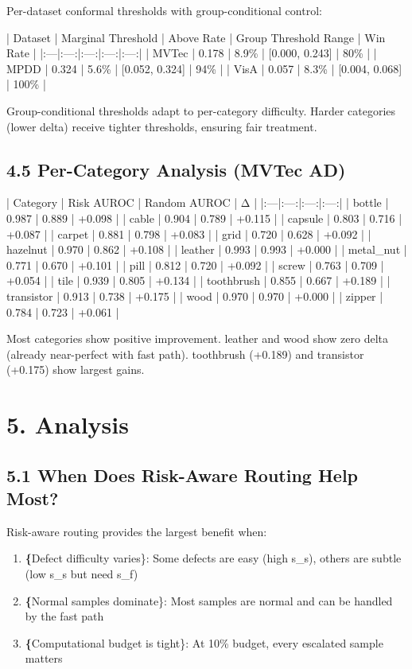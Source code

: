 \documentclass[10pt]{article}
\begin{document}
Per-dataset conformal thresholds with group-conditional control:

| Dataset | Marginal Threshold | Above Rate | Group Threshold Range | Win Rate |
|:---|:---:|:---:|:---:|:---:|
| MVTec | 0.178 | 8.9\% | [0.000, 0.243] | 80\% |
| MPDD | 0.324 | 5.6\% | [0.052, 0.324] | 94\% |
| VisA | 0.057 | 8.3\% | [0.004, 0.068] | 100\% |

Group-conditional thresholds adapt to per-category difficulty. Harder categories (lower delta) receive tighter thresholds, ensuring fair treatment.

\subsection{4.5 Per-Category Analysis (MVTec AD)}

| Category | Risk AUROC | Random AUROC | Δ |
|:---|:---:|:---:|:---:|
| bottle | 0.987 | 0.889 | +0.098 |
| cable | 0.904 | 0.789 | +0.115 |
| capsule | 0.803 | 0.716 | +0.087 |
| carpet | 0.881 | 0.798 | +0.083 |
| grid | 0.720 | 0.628 | +0.092 |
| hazelnut | 0.970 | 0.862 | +0.108 |
| leather | 0.993 | 0.993 | +0.000 |
| metal\_nut | 0.771 | 0.670 | +0.101 |
| pill | 0.812 | 0.720 | +0.092 |
| screw | 0.763 | 0.709 | +0.054 |
| tile | 0.939 | 0.805 | +0.134 |
| toothbrush | 0.855 | 0.667 | +0.189 |
| transistor | 0.913 | 0.738 | +0.175 |
| wood | 0.970 | 0.970 | +0.000 |
| zipper | 0.784 | 0.723 | +0.061 |

Most categories show positive improvement. leather and wood show zero delta (already near-perfect with fast path). toothbrush (+0.189) and transistor (+0.175) show largest gains.

\section{5. Analysis}

\subsection{5.1 When Does Risk-Aware Routing Help Most?}

Risk-aware routing provides the largest benefit when:
\begin{enumerate}
\item \textbf\{Defect difficulty varies\}: Some defects are easy (high s\_s), others are subtle (low s\_s but need s\_f)
\item \textbf\{Normal samples dominate\}: Most samples are normal and can be handled by the fast path
\item \textbf\{Computational budget is tight\}: At 10\% budget, every escalated sample matters
\end{enumerate}
\end{document}
